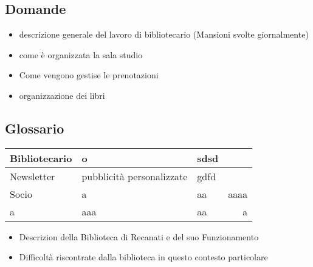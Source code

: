 \documentclass{tstextbook}
\begin{document}
\subsection{Domande}
\begin{itemize}
	\item descrizione generale del lavoro di bibliotecario (Mansioni svolte giornalmente)
	\item come è organizzata la sala studio 
	\item Come vengono gestise le prenotazioni
	\item organizzazione dei libri 
	
\end{itemize}


\subsection{Glossario}

\begin{tabular}{|l|l|l|r|}
	\hline
	Bibliotecario & o & sdsd\\
	\hline
	Newsletter & pubblicità personalizzate & gdfd \\
	Socio & a & aa & aaaa\\
	\hline
	a & aaa & aa & a\\
\hline
\end{tabular}

\begin{itemize}
	
	\item Descrizion della Biblioteca di Recanati e del suo  Funzionamento
	\item Difficoltà riscontrate dalla biblioteca in questo contesto particolare
	
\end{itemize}
\end{document}
